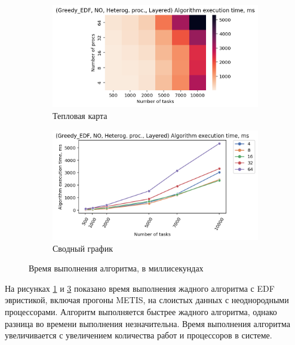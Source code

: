 \begin{figure}[!htbp]
    \centering
    \begin{subfigure}{0.49\textwidth}
        \includegraphics[width=\textwidth]{imgs/unbalanced/NO_EDF/et_heatmap.png}
        \caption{Тепловая карта}
        \label{fig:NO-unbalanced-EDF-exec-time-heatmap}
    \end{subfigure}
    \hfill
    \begin{subfigure}{0.49\textwidth}
        \includegraphics[width=\textwidth]{imgs/unbalanced/NO_EDF/tr_graph.png}
        \caption{Сводный график}
        \label{fig:NO-unbalanced-EDF-exec-time-compiled}
    \end{subfigure}
    \caption{Время выполнения алгоритма, в миллисекундах}
\end{figure}

На рисунках \ref{fig:NO-unbalanced-EDF-exec-time-heatmap} и \ref{fig:NO-unbalanced-EDF-exec-time-compiled} показано время выполнения жадного алгоритма с EDF эвристикой, включая прогоны METIS, на слоистых данных с неоднородными процессорами. Алгоритм выполняется быстрее жадного алгоритма, однако разница во времени выполнения незначительна. Время выполнения алгоритма увеличивается с увеличением количества работ и процессоров в системе.

